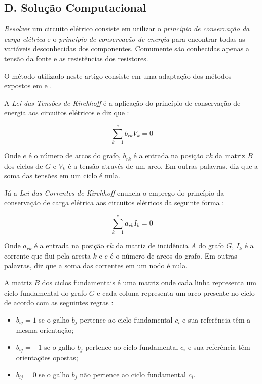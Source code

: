 \documentclass[twocolumn, 10pt,a4paper]{extarticle}
\begin{document}
\subsection*{D. \quad Solução Computacional}

\textit{Resolver} um circuito elétrico consiste em utilizar o \textit{princípio de conservação da carga elétrica} e o \textit{princípio de conservação de energia} para encontrar todas as variáveis desconhecidas dos componentes. Comumente são conhecidas apenas a tensão da fonte e as resistências dos resistores.

O método utilizado neste artigo consiste em uma adaptação dos métodos expostos em \cite{krishna} e \cite{boruah}.

A \textit{Lei das Tensões de Kirchhoff} é a aplicação do princípio de conservação de energia aos circuitos elétricos e diz que \cite[p. 945]{boruah}:

\[
\sum_{k=1}^{e} b_{rk}V_k = 0
\]

Onde $e$ é o número de arcos do grafo, $b_{rk}$ é a entrada na posição $rk$ da matriz $B$ dos ciclos de $G$ e $V_k$ é a tensão através de um arco. Em outras palavras, diz que a soma das tensões em um ciclo é nula.

Já a \textit{Lei das Correntes de Kirchhoff} enuncia o emprego do princípio da conservação de carga elétrica aos circuitos elétricos da seguinte forma \cite[p. 945]{boruah}:

\[
\sum_{k=1}^{e} a_{rk}I_k = 0
\]

Onde $a_{rk}$ é a entrada na posição $rk$ da matriz de incidência $A$ do grafo $G$, $I_k$ é a corrente que flui pela aresta $k$ e $e$ é o número de arcos do grafo. Em outras palavras, diz que a soma das correntes em um nodo é nula.

A matriz $B$ dos ciclos fundamentais é uma matriz onde cada linha representa um ciclo fundamental do grafo $G$ e cada coluna representa um arco presente no ciclo de acordo com as seguintes regras \cite[p. 948]{boruah}:

\begin{itemize}
	\item $b_{ij} = 1$ se o galho $b_j$ pertence ao ciclo fundamental $c_i$ e sua referência têm a mesma orientação;
	\item $b_{ij} = -1$ se o galho $b_j$ pertence ao  ciclo fundamental $c_i$ e sua referência têm orientações opostas;
	\item $b_{ij} = 0$ se o galho $b_j$ não pertence ao ciclo fundamental $c_i$.
\end{itemize}
\end{document}
